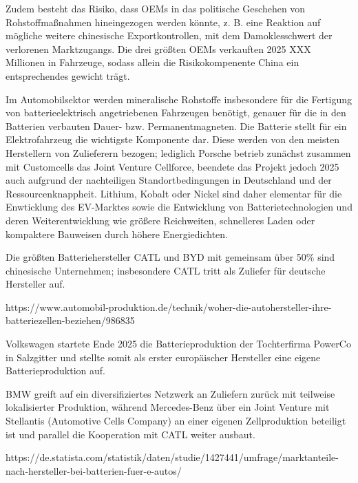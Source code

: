 \documentclass[12pt,a4paper,oneside]{book} %
\begin{document}
Zudem besteht das Risiko, dass OEMs in das politische Geschehen von Rohstoffmaßnahmen hineingezogen werden könnte, z. B. eine Reaktion auf mögliche weitere chinesische Exportkontrollen, mit dem Damoklesschwert der verlorenen Marktzugangs. Die drei größten OEMs verkauften 2025 XXX Millionen in Fahrzeuge, sodass allein die Risikokompenente China ein entsprechendes gewicht trägt.

Im Automobilsektor werden mineralische Rohstoffe insbesondere für die Fertigung von batterieelektrisch angetriebenen Fahrzeugen benötigt, genauer für die in den Batterien verbauten Dauer- bzw. Permanentmagneten. Die Batterie stellt für ein Elektrofahrzeug die wichtigste Komponente dar. Diese werden von den meisten Herstellern von Zulieferern bezogen; lediglich Porsche betrieb zunächst zusammen mit Customcells das Joint Venture Cellforce, beendete das Projekt jedoch 2025 auch aufgrund der nachteiligen Standortbedingungen in Deutschland und der Ressourcenknappheit. \autocite{https://www.tagesschau.de/wirtschaft/porsche-batteriezellen-cellforce-100.html} Lithium, Kobalt oder Nickel sind daher elementar für die Enwticklung des EV-Marktes sowie die Entwicklung von Batterietechnologien und deren Weiterentwicklung wie größere Reichweiten, schnelleres Laden oder kompaktere Bauweisen durch höhere Energiedichten.

Die größten Batteriehersteller CATL und BYD mit gemeinsam über 50\% sind chinesische Unternehmen; insbesondere CATL tritt als Zuliefer für deutsche Hersteller auf.

https://www.automobil-produktion.de/technik/woher-die-autohersteller-ihre-batteriezellen-beziehen/986835

Volkswagen startete Ende 2025 die Batterieproduktion der Tochterfirma PowerCo in Salzgitter und stellte somit als erster europäischer Hersteller eine eigene Batterieproduktion auf.\autocite{https://www.volkswagen-group.com/de/pressemitteilungen/start-fuer-europaeische-batteriezellfertigung-powerco-nimmt-gigafabrik-salzgitter-in-betrieb-20045}

BMW greift auf ein diversifiziertes Netzwerk an Zuliefern zurück mit teilweise lokalisierter Produktion,\autocite{https://www.automobil-produktion.de/produktionsnetzwerke/das-ist-bmws-produktionsnetzwerk-fuer-batterien/1062855}
während Mercedes-Benz über ein Joint Venture mit Stellantis (Automotive Cells Company) an einer eigenen Zellproduktion beteiligt ist und parallel die Kooperation mit CATL weiter ausbaut.

https://de.statista.com/statistik/daten/studie/1427441/umfrage/marktanteile-nach-hersteller-bei-batterien-fuer-e-autos/
\end{document}

